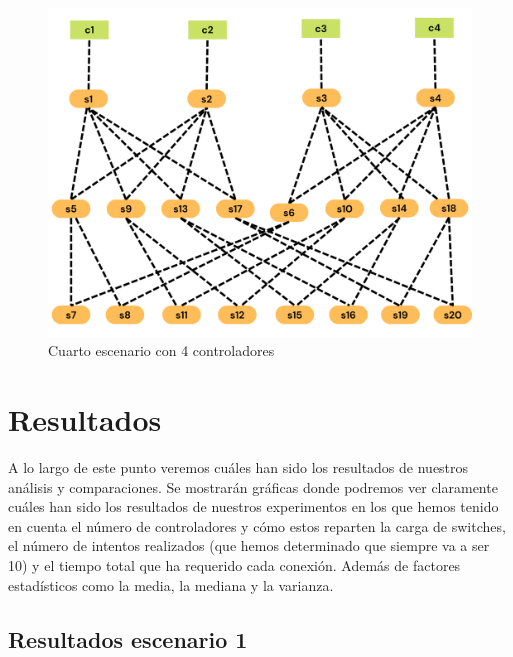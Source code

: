 \documentclass[a4paper, 12pt]{book}
\begin{document}
	
	\begin{figure}[H]
		\centering
		\includegraphics[width=16cm, keepaspectratio]{img/e4_3}
		\caption{Cuarto escenario con 4 controladores}
		\label{figura:e4_3}
	\end{figure}

	
	\clearpage
	\chapter{Resultados}
	\label{chap:resultados}

	A lo largo de este punto veremos cuáles han sido los resultados de nuestros análisis y comparaciones. Se mostrarán gráficas donde podremos ver claramente cuáles han sido los resultados de nuestros experimentos en los que hemos tenido en cuenta el número de controladores y cómo estos reparten la carga de switches, el número de intentos realizados (que hemos determinado que siempre va a ser 10) y el tiempo total que ha requerido cada conexión. Además de factores estadísticos como la media, la mediana y la varianza.

\section{Resultados escenario 1} 
	\label{sec:resultEsc1}
 
\end{document}
